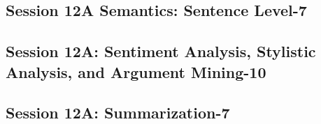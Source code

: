 \subsection{\large Session 12A Semantics: Sentence Level-7}
\label{parallel-session-12A-trackG}
\TrackGLoc\hfill\sessionchair{}{}
\clearpage
\subsection{\large Session 12A: Sentiment Analysis, Stylistic Analysis, and Argument Mining-10}
\label{parallel-session-12A-trackH}
\TrackHLoc\hfill\sessionchair{}{}
\clearpage
\subsection{\large Session 12A: Summarization-7}
\label{parallel-session-12A-trackI}
\TrackILoc\hfill\sessionchair{}{}
\clearpage



